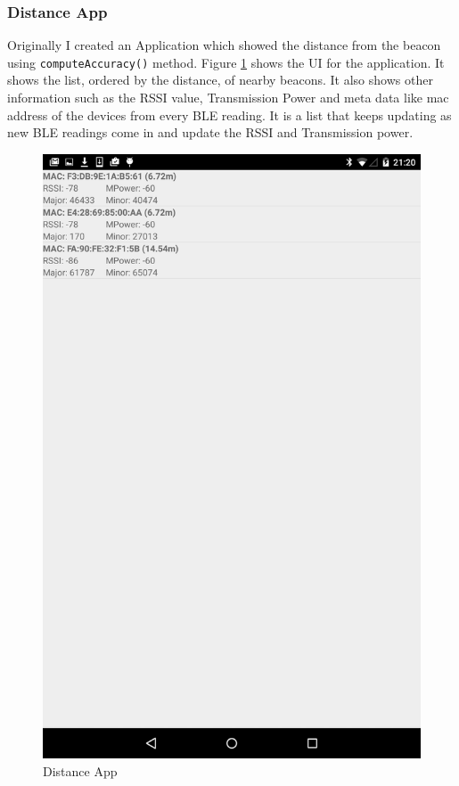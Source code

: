 \subsubsection{Distance App} \label{nocamera_distanceapp}
Originally I created an Application which showed the distance from the beacon using \lstinline|computeAccuracy()| method. Figure \ref{distance_app_image} shows the UI for the application. It shows the list, ordered by the distance, of nearby beacons. It also shows other information such as the RSSI value, Transmission Power and meta data like mac address of the devices from every BLE reading.
It is a list that keeps updating as new BLE readings come in and update the RSSI and Transmission power.

\begin{figure}[h]
  \includegraphics[scale=0.2]{images/distance}
  \protect\caption{Distance App} 
  \label{distance_app_image}
\end{figure}

